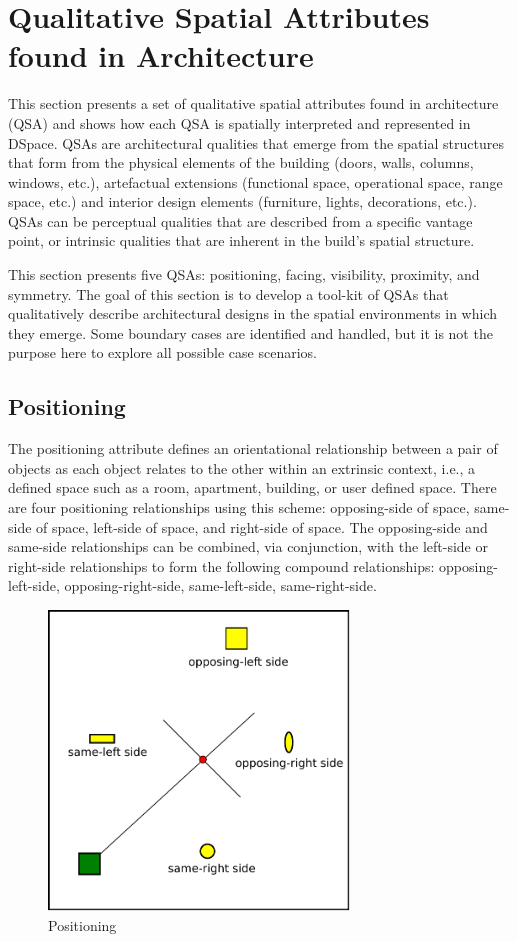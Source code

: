 \documentclass[12pt]{ucthesis}
\begin{document}
\section{Qualitative Spatial Attributes found in Architecture}
This section presents a set of qualitative spatial attributes found in architecture (QSA) and shows how each QSA is spatially interpreted and represented in DSpace. QSAs are architectural qualities that emerge from the spatial structures that form from the physical elements of the building (doors, walls, columns, windows, etc.), artefactual extensions (functional space, operational space, range space, etc.) and interior design elements (furniture, lights, decorations, etc.). QSAs can be perceptual qualities that are described from a specific vantage point, or intrinsic qualities that are inherent in the build's spatial structure. 

This section presents five QSAs: positioning, facing, visibility, proximity, and symmetry. The goal of this section is to develop a tool-kit of QSAs that qualitatively describe architectural designs in the spatial environments in which they emerge. Some boundary cases are identified and handled, but it is not the purpose here to explore all possible case scenarios.

\subsection{Positioning}
The positioning attribute defines an orientational relationship between a pair of objects as each object relates to the other within an extrinsic context, i.e., a defined space such as a room, apartment, building, or user defined space. There are four positioning relationships using this scheme: opposing-side of space, same-side of space, left-side of space, and right-side of space. The opposing-side and same-side relationships can be combined, via conjunction, with the left-side or right-side relationships to form the following compound relationships: opposing-left-side, opposing-right-side, same-left-side, same-right-side.

\begin{figure}[H]
\centering
\includegraphics[width=80mm]{position}
\caption{Positioning}
\label{position}
\end{figure}
\end{document}
